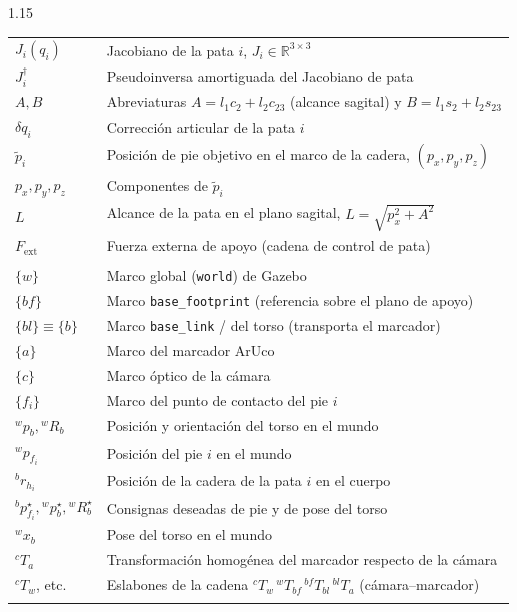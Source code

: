 \documentclass[12pt,a4paper]{report}
\begin{document}
\begin{spacing}{1.15}
\begin{longtable}{@{} p{3.1cm} p{11.3cm} @{}}
\(J_i(q_i)\)     & Jacobiano de la pata \(i\), \(J_i\in\mathbb{R}^{3\times 3}\) \\
\(J_i^{\dagger}\)& Pseudoinversa amortiguada del Jacobiano de pata \\
\(A,B\)          & Abreviaturas \(A=l_1c_2+l_2c_{23}\) (alcance sagital) y \(B=l_1s_2+l_2s_{23}\) \\
\(\delta q_i\)   & Corrección articular de la pata \(i\) \\
\(\tilde p_i\)   & Posición de pie objetivo en el marco de la cadera, \((p_x,p_y,p_z)\) \\
\(p_x,p_y,p_z\)  & Componentes de \(\tilde p_i\) \\
\(L\)            & Alcance de la pata en el plano sagital, \(L=\sqrt{p_x^2+A^2}\) \\
\(F_{\text{ext}}\) & Fuerza externa de apoyo (cadena de control de pata) \\
\addlinespace[4pt]

\multicolumn{2}{@{}l@{}}{\textit{Marcos de referencia y transformaciones}}\\[2pt]
\(\{w\}\)        & Marco global (\texttt{world}) de Gazebo \\
\(\{bf\}\)       & Marco \texttt{base\_footprint} (referencia sobre el plano de apoyo) \\
\(\{bl\}\equiv\{b\}\) & Marco \texttt{base\_link} / del torso (transporta el marcador) \\
\(\{a\}\)        & Marco del marcador ArUco \\
\(\{c\}\)        & Marco óptico de la cámara \\
\(\{f_i\}\)      & Marco del punto de contacto del pie \(i\) \\
\({}^{w}p_b,{}^{w}R_b\) & Posición y orientación del torso en el mundo \\
\({}^{w}p_{f_i}\) & Posición del pie \(i\) en el mundo \\
\({}^{b}r_{h_i}\) & Posición de la cadera de la pata \(i\) en el cuerpo \\
\({}^{b}p_{f_i}^{\star},{}^{w}p_b^{\star},{}^{w}R_b^{\star}\) & Consignas deseadas de pie y de pose del torso \\
\({}^{w}x_b\)    & Pose del torso en el mundo \\
\({}^{c}T_a\)    & Transformación homogénea del marcador respecto de la cámara \\
\({}^{c}T_w\), etc. & Eslabones de la cadena \({}^{c}T_w\,{}^{w}T_{bf}\,{}^{bf}T_{bl}\,{}^{bl}T_a\) (cámara--marcador) \\
\addlinespace[4pt]


\end{longtable}
\end{spacing}
\end{document}
